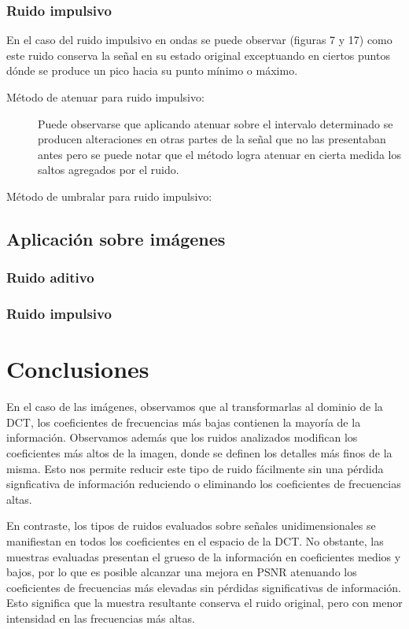 \documentclass[a4paper,10pt,twoside]{article}
\begin{document}
\subsubsection{Ruido impulsivo}
En el caso del ruido impulsivo en ondas se puede observar (figuras 7 y 17) como este ruido conserva la señal en su estado original exceptuando en ciertos puntos dónde se produce un pico hacia su punto mínimo o máximo.
\begin{description}
\item[Método de atenuar para ruido impulsivo:]
Puede observarse que aplicando atenuar sobre el intervalo determinado se producen alteraciones en otras partes de la señal que no las presentaban antes pero se puede notar que el método logra atenuar en cierta medida los saltos agregados por el ruido.
\item[Método de umbralar para ruido impulsivo:]
\end{description}

\subsection{Aplicación sobre imágenes}
\subsubsection{Ruido aditivo}
\subsubsection{Ruido impulsivo}


\section{Conclusiones}

En el caso de las imágenes, observamos que al transformarlas al dominio de la DCT, los coeficientes de frecuencias más bajas contienen la mayoría de la información. Observamos además que los ruidos analizados modifican los coeficientes más altos de la imagen, donde se definen los detalles más finos de la misma. Esto nos permite reducir este tipo de ruido fácilmente sin una pérdida signficativa de información reduciendo o eliminando los coeficientes de frecuencias altas.

En contraste, los tipos de ruidos evaluados sobre señales unidimensionales se manifiestan en todos los coeficientes en el espacio de la DCT. No obstante, las muestras evaluadas presentan el grueso de la información en coeficientes medios y bajos, por lo que es posible alcanzar una mejora en PSNR atenuando los coeficientes de frecuencias más elevadas sin pérdidas significativas de información. Esto significa que la muestra resultante conserva el ruido original, pero con menor intensidad en las frecuencias más altas.
\end{document}
